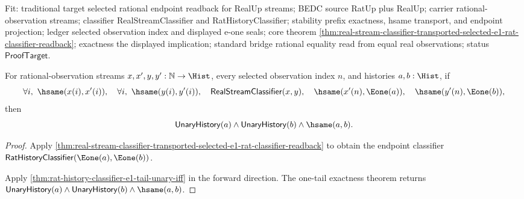 Fit: traditional target selected rational endpoint readback for RealUp streams;
BEDC source RatUp plus RealUp; carrier rational-observation streams; classifier
RealStreamClassifier and RatHistoryClassifier; stability prefix exactness,
hsame transport, and endpoint projection; ledger selected observation index and
displayed e-one seals; core theorem
\autoref{thm:real-stream-classifier-transported-selected-e1-rat-classifier-readback};
exactness the displayed implication; standard bridge rational equality read from
equal real observations; status $\mathsf{ProofTarget}$.

\begin{theorem}
\label{thm:real-stream-classifier-transported-selected-e1-pair-readback}
For rational-observation streams $x,x',y,y':\mathbb{N}\to\Hist$, every selected
observation index $n$, and histories $a,b:\Hist$, if
$$
\forall i,\ \hsame(x(i),x'(i)),\quad
\forall i,\ \hsame(y(i),y'(i)),\quad
\mathsf{RealStreamClassifier}(x,y),\quad
\hsame(x'(n),\Eone(a)),\quad
\hsame(y'(n),\Eone(b)),
$$
then
$$
\mathsf{UnaryHistory}(a)\land \mathsf{UnaryHistory}(b)\land \hsame(a,b).
$$
\end{theorem}
\begin{proof}
Apply
\autoref{thm:real-stream-classifier-transported-selected-e1-rat-classifier-readback}
to obtain the endpoint classifier
$\mathsf{RatHistoryClassifier}(\Eone(a),\Eone(b))$.

Apply \autoref{thm:rat-history-classifier-e1-tail-unary-iff} in the forward
direction. The one-tail exactness theorem returns
$\mathsf{UnaryHistory}(a)\land \mathsf{UnaryHistory}(b)\land \hsame(a,b)$.
\end{proof}

